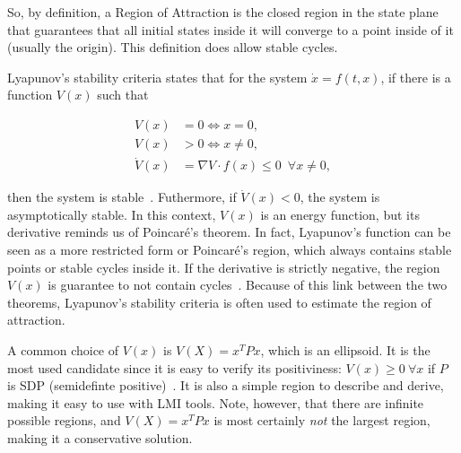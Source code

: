 So, by definition, a Region of Attraction is the closed region in the state
plane that guarantees that all initial states inside it will converge to a point
inside of it (usually the origin). This definition does allow stable cycles.

Lyapunov's stability criteria states that for the system \(\dot{x} = f(t, x)\),
if there is a function \(V(x)\) such that

\begin{align}
	V(x)       & = 0 \iff x = 0,                                           \\
	V(x)       & > 0 \iff x \ne 0,                                         \\
	\dot{V}(x) & = \nabla{}V\cdot{}f(x) \le 0 \phantom{0} \forall x \ne 0,
\end{align}

then the system is stable~\parencite{chen:linear,hespanha:linear}. Futhermore,
if \(\dot{V}(x)<0\), the system is asymptotically stable. In this context,
\(V(x)\) is an energy function, but its derivative reminds us of Poincaré's
theorem. In fact, Lyapunov's function can be seen as a more restricted form or
Poincaré's region, which always contains stable points or stable cycles inside
it. If the derivative is strictly negative, the region \(V(x)\) is guarantee to
not contain cycles~\parencite{chen:linear}. Because of this link between the two
theorems, Lyapunov's stability criteria is often used to estimate the region of
attraction.

A common choice of \(V(x)\) is \(V(X)=x^{T}Px\), which is an ellipsoid. It is
the most used candidate since it is easy to verify its positiviness:
\(V(x)\ge{}0~\forall{}x\) if \(P\) is SDP (semidefinte
positive)~\parencite{bochnak.coste.ea:real-algebraic-geometry}. It is also a
simple region to describe and derive, making it easy to use with LMI tools.
Note, however, that there are infinite possible regions, and \(V(X)=x^{T}Px\) is
most certainly \textit{not} the largest region, making it a conservative
solution.
